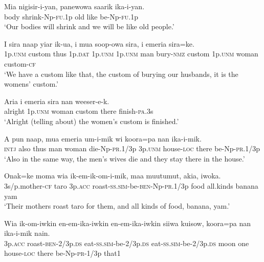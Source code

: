 \ea\label{ex:a:x25}
\gll  Mia  nigisir-i-yan,  panewowa  saarik  ika-i-yan. \\
body  shrink-Np-\textsc{fu}.1p  old  like  be-Np-\textsc{fu}.1p \\
\glt ‘Our bodies will shrink and we will be like old people.’ \\
\z


\ea\label{ex:a:x26}
\gll  I  sira  naap  yiar  ik-ua,  i  mua  soop-owa  sira,          i  emeria  sira=ke. \\
1p.\textsc{unm}  custom  thus  1p.\textsc{dat}  1p.\textsc{unm}  1p.\textsc{unm}  man  bury-\textsc{nmz}  custom 1p.\textsc{unm}  woman  custom-\textsc{cf} \\


\glt ‘We have a custom like that, the custom of burying our husbands, it is the womens’ custom.’ \\
\z


\ea\label{ex:a:x27}
\gll  Aria  i  emeria  sira  nan  weeser-e-k. \\
alright  1p.\textsc{unm}  woman  custom  there  finish-\textsc{pa}.3s \\
\glt ‘Alright (telling about) the women’s custom is finished.’ \\
\z


\ea\label{ex:a:x28}
\gll  A  pun  naap,  mua  emeria  um-i-mik  wi  koora=pa  nan          ika-i-mik. \\
\textsc{intj}  also  thus  man  woman  die-Np-\textsc{pr}.1/3p  3p.\textsc{unm}  house-\textsc{loc}  there be-Np-\textsc{pr}.1/3p \\


\glt ‘Also in the same way, the men’s wives die and they stay there in the house.’ \\
\z


\ea\label{ex:a:x29}
\gll  Onak=ke  moma  wia  ik-em-ik-om-i-mik,  maa                   muutumut,  akia,  iwoka. \\
3s/p.mother-\textsc{cf}  taro  3p.\textsc{acc}  roast-\textsc{ss}.\textsc{sim}-be-\textsc{ben}-Np-\textsc{pr}.1/3p  food  all.kinds  banana  yam \\


\glt ‘Their mothers roast taro for them, and all kinds of food, banana, yam.’ \\
\z


\ea\label{ex:a:x30}
\gll  Wia  ik-om-iwkin  en-em-ika-iwkin  en-em-ika-iwkin                siiwa  kuisow,  koora=pa  nan  ika-i-mik  nain. \\
3p.\textsc{acc}  roast-\textsc{ben}-2/3p.\textsc{ds}  eat-\textsc{ss}.\textsc{sim}-be-2/3p.\textsc{ds}  eat-\textsc{ss}.\textsc{sim}-be-2/3p.\textsc{ds} moon  one  house-\textsc{loc}  there  be-Np-\textsc{pr}-1/3p  that1 \\


